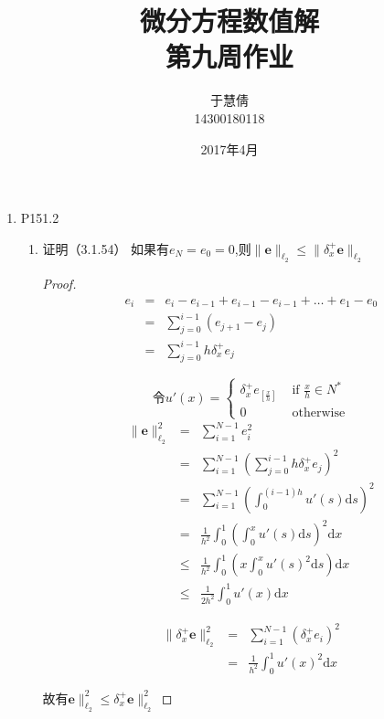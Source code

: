 \documentclass{ctexart}
\title{微分方程数值解 \\ 第九周作业}
\author{于慧倩 \\ 14300180118}
\date{2017年4月}
\begin{document}
\maketitle

\newpage

\begin{enumerate}
\item P151.2

\begin{enumerate}
\item 证明（3.1.54） 如果有\(e_N=e_0=0\),则\( \| \bm{e}\|_{\ell_2} \leq \|\delta_x^+ \bm{e}\|_{\ell_2} \)

\begin{proof}

\begin{eqnarray*}
e_i &=& e_i-e_{i-1}+e_{i-1} - e_{i-1} +\dots +e_1-e_0\\
&=&\sum_{j=0}^{i-1} (e_{j+1}-e_j)\\
&=&\sum_{j=0}^{i-1} h \delta_x^+ e_j
\end{eqnarray*}

\[\mbox{令} u'(x) = \left \{ \begin{array}{rl}
 \delta_x^+ e_{[ \frac{x}{h}]} &\mbox{ if $\frac{x}{h} \in N^*$} \\
  0 &\mbox{ otherwise}
       \end{array} \right.
\]
\begin{eqnarray*}
\|\bm{e}\|_{\ell_2}^2 &=& \sum_{i=1}^{N-1} e_i^2\\
&=&\sum_{i=1}^{N-1} (\sum_{j=0}^{i-1} h \delta_x^+ e_j)^2\\
&=& \sum_{i=1}^{N-1}( \int_0^{(i-1)h} u' (s) \mbox{d} s)^2\\
&=& \frac{1}{h^2} \int_0^1( \int_0^x u' (s) \mbox{d} s)^2 \mbox{d}x\\
&\leq& \frac{1}{h^2} \int_0^1(x \int_0^x u'(s)^2\mbox{d}s)\mbox{d}x\\
&\leq&\frac{1}{2h^2} \int_0^1u'(x)\mbox{d}x
\end{eqnarray*}

\begin{eqnarray*}
\| \delta_x^+ \bm{e}\|_{\ell_2}^2 &=& \sum_{i=1}^{N-1} (\delta_x^+ e_i)^2\\
&=& \frac{1}{h^2}\int_0^1u' (x)^2 \mbox{d} x
\end{eqnarray*}

故有\(\bm{e}\|_{\ell_2}^2 \leq \delta_x^+ \bm{e}\|_{\ell_2}^2 \)

\end{proof}


\end{enumerate}
\end{enumerate}
\end{document}
